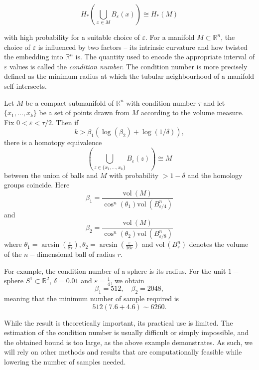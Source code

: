 \begin{equation*}
  H_{*}\left(\bigcup_{x \in M} B_{\varepsilon}(x) \right) \cong H_{*}(M)
\end{equation*}

with high probability for a suitable choice of $\varepsilon$. For a manifold $M \subset \mathbb{R}^{n}$, the choice of $\varepsilon$ is influenced by two factors -- its intrinsic curvature and how twisted the embedding into $\mathbb{R}^{n}$ is. The quantity used to encode the appropriate interval of $\varepsilon$ values is called the \textit{condition number}. The condition number is more precisely defined as the minimum radius at which the tubular neighbourhood of a manifold self-intersects.

\begin{theorem}
  Let $M$ be a compact submanifold of $\mathbb{R}^{n}$ with condition number $\tau$ and let $\{x_{1}, \ldots, x_{k}\}$ be a set of points drawn from $M$ according to the volume measure. Fix $0 < \varepsilon < \tau/2$. Then if
  \begin{equation*}
    k > \beta_{1}\left(\log(\beta_{2}) + \log(1/\delta) \right),
  \end{equation*}
  there is a homotopy equivalence
  \begin{equation*}
    \left(\bigcup_{z \in \{x_{1}, \ldots, x_{k}\}} B_{\varepsilon}(z) \right) \cong M
  \end{equation*}
  between the union of balls and $M$ with probability $> 1 - \delta$ and the homology groups coincide. Here
  \begin{equation*}
    \beta_{1} = \frac{\text{vol}\:(M)}{\cos^{n}(\theta_{1})\text{vol}\:(B^{n}_{\varepsilon/4})}
  \end{equation*}
  and
  \begin{equation*}
    \beta_{2} = \frac{\text{vol}\:(M)}{\cos^{n}(\theta_{2})\text{vol}\:(B^{n}_{\varepsilon/8})}
  \end{equation*}
  where $\theta_{1} = \arcsin(\frac{\varepsilon}{8\tau}), \theta_{2} = \arcsin(\frac{\varepsilon}{16\tau})$ and $\text{vol}\:(B^{n}_{r})$
  denotes the volume of the $n-$dimensional ball of radius $r$.
\end{theorem}

For example, the condition number of a sphere is its radius. For the unit $1-$sphere $S^{1} \subset \mathbb{R}^{2}$, $\delta = 0.01$ and $\varepsilon = \frac{1}{4}$, we obtain
\begin{equation*}
  \beta_{1} = 512, \quad \beta_{2} = 2048,
\end{equation*}
meaning that the minimum number of sample required is
\begin{equation*}
  512(7.6 + 4.6) \sim 6260.
\end{equation*}

While the result is theoretically important, its practical use is limited. The estimation of the condition number is usually difficult or simply impossible, and the obtained bound is too large, as the above example demonstrates. As such, we will rely on other methods and results that are computationally feasible while lowering the number of samples needed.
